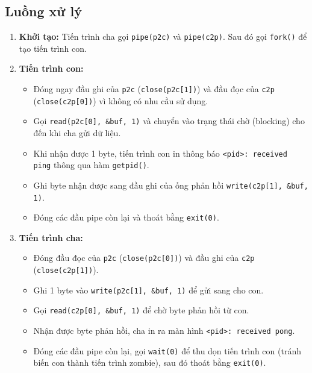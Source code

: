 \subsection{Luồng xử lý}
\begin{enumerate}
  \item \textbf{Khởi tạo:} Tiến trình cha gọi \texttt{pipe(p2c)} và \texttt{pipe(c2p)}. Sau đó gọi \texttt{fork()} để tạo tiến trình con.
  \item \textbf{Tiến trình con:}
    \begin{itemize}
      \item Đóng ngay đầu ghi của \texttt{p2c} (\texttt{close(p2c[1])}) và đầu đọc của \texttt{c2p} (\texttt{close(c2p[0])}) vì không có nhu cầu sử dụng.
      \item Gọi \texttt{read(p2c[0], \&buf, 1)} và chuyển vào trạng thái chờ (blocking) cho đến khi cha gửi dữ liệu.
      \item Khi nhận được 1 byte, tiến trình con in thông báo \texttt{<pid>: received ping} thông qua hàm \texttt{getpid()}.
      \item Ghi byte nhận được sang đầu ghi của ống phản hồi \texttt{write(c2p[1], \&buf, 1)}.
      \item Đóng các đầu pipe còn lại và thoát bằng \texttt{exit(0)}.
    \end{itemize}
  \item \textbf{Tiến trình cha:}
    \begin{itemize}
      \item Đóng đầu đọc của \texttt{p2c} (\texttt{close(p2c[0])}) và đầu ghi của \texttt{c2p} (\texttt{close(c2p[1])}).
      \item Ghi 1 byte vào \texttt{write(p2c[1], \&buf, 1)} để gửi sang cho con.
      \item Gọi \texttt{read(c2p[0], \&buf, 1)} để chờ byte phản hồi từ con.
      \item Nhận được byte phản hồi, cha in ra màn hình \texttt{<pid>: received pong}.
      \item Đóng các đầu pipe còn lại, gọi \texttt{wait(0)} để thu dọn tiến trình con (tránh biến con thành tiến trình zombie), sau đó thoát bằng \texttt{exit(0)}.
    \end{itemize}
\end{enumerate}


